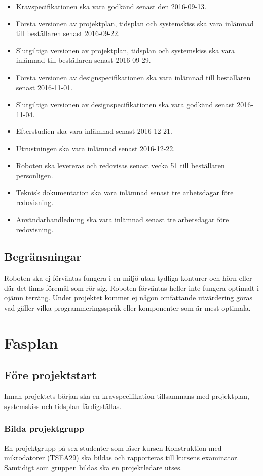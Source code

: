 \documentclass{article}
\begin{document}
\begin{itemize}
    \item Kravspecifikationen ska vara godkänd senast den 2016-09-13.
    \item Första versionen av projektplan, tidsplan och systemskiss ska vara inlämnad till beställaren senast 2016-09-22.
    \item Slutgiltiga versionen av projektplan, tidsplan och systemskiss ska vara inlämnad till beställaren senast 2016-09-29.
    \item Första versionen av designspecifikationen ska vara inlämnad till beställaren senast 2016-11-01.
    \item Slutgiltiga versionen av designspecifikationen ska vara godkänd senast 2016-11-04.
    \item Efterstudien ska vara inlämnad senast 2016-12-21.
    \item Utrustningen ska vara inlämnad senast 2016-12-22.
    \item Roboten ska levereras och redovisas senast vecka 51 till beställaren personligen.
    \item Teknisk dokumentation ska vara inlämnad senast tre arbetsdagar före redovisning.
    \item Användarhandledning ska vara inlämnad senast tre arbetsdagar före redovisning.
\end{itemize}


\subsection{Begränsningar}
Roboten ska ej förväntas fungera i en miljö utan tydliga konturer och hörn eller där det finns föremål som rör sig. Roboten förväntas heller inte fungera optimalt i ojämn terräng. Under projektet kommer ej någon omfattande utvärdering göras vad gäller vilka programmeringsspråk eller komponenter som är mest optimala.

\section{Fasplan}

\subsection{Före projektstart}
Innan projektets början ska en kravspecifikation tillsammans med projektplan, systemskiss och tidsplan färdigställas.

\subsubsection{Bilda projektgrupp}
En projektgrupp på sex studenter som läser kursen Konstruktion med mikrodatorer (TSEA29) ska bildas och rapporteras till kursens examinator. Samtidigt som gruppen bildas ska en projektledare utses.
\end{document}
